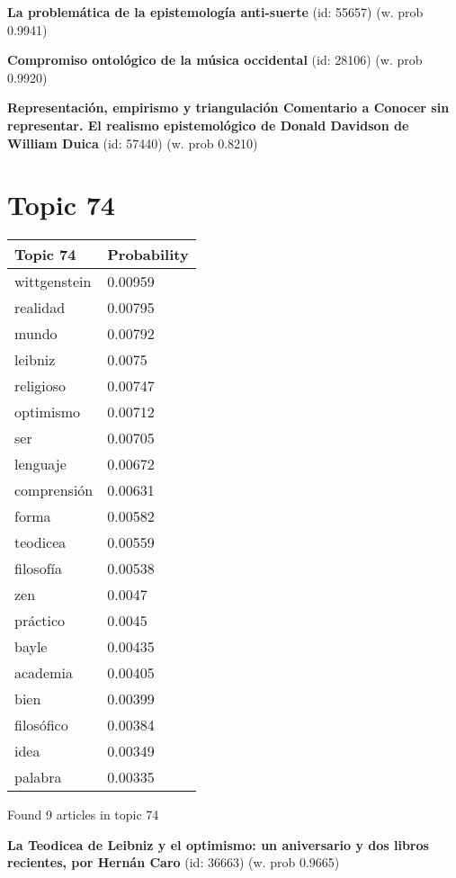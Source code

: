 \documentclass{article}
\begin{document}
\textbf{La problemática de la epistemología anti-suerte} (id: 55657)
 (w. prob 0.9941)
\vfill

\textbf{Compromiso ontológico de la música occidental} (id: 28106)
 (w. prob 0.9920)
\vfill

\textbf{Representación,  empirismo y triangulación Comentario a Conocer  sin representar. El realismo  epistemológico de Donald Davidson de William Duica} (id: 57440)
 (w. prob 0.8210)

\vfill
\newpage


\centering
\thispagestyle{empty}
\section*{Topic 74}\vfill
\begin{tabular}{ll}
\toprule
     Topic 74 & Probability \\
\midrule
 wittgenstein &     0.00959 \\
     realidad &     0.00795 \\
        mundo &     0.00792 \\
      leibniz &      0.0075 \\
    religioso &     0.00747 \\
    optimismo &     0.00712 \\
          ser &     0.00705 \\
     lenguaje &     0.00672 \\
  comprensión &     0.00631 \\
        forma &     0.00582 \\
     teodicea &     0.00559 \\
    filosofía &     0.00538 \\
          zen &      0.0047 \\
     práctico &      0.0045 \\
        bayle &     0.00435 \\
     academia &     0.00405 \\
         bien &     0.00399 \\
   filosófico &     0.00384 \\
         idea &     0.00349 \\
      palabra &     0.00335 \\
\bottomrule
\end{tabular}

\vfill
Found 9 articles in topic 74
\vfill

\textbf{La Teodicea de Leibniz y el optimismo: un aniversario y dos libros recientes, por Hernán Caro} (id: 36663)
 (w. prob 0.9665)
\vfill
\end{document}
